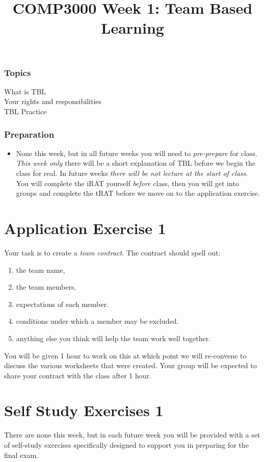 \documentclass[twoside=false,DIV=14]{scrartcl}
\title{\color{redish} \vspace{-1em}COMP3000 Week 1: Team Based Learning}
\begin{document}
{\color{blackish}\maketitle}\vspace{-7em}

\begin{abstract}
\end{abstract}

\section*{Topics}
\begin{description}
\item[What is TBL]  
\item[Your rights and responsibilities]  
\item[TBL Practice]
\end{description}
\section*{Preparation}
\begin{itemize}
\item None this week, but in all future weeks you will need to \emph{pre-prepare} for class.  \emph{This week only} there will be a short explanation of TBL before we begin the class for real.  In future weeks \emph{there will be not lecture at the start of class}.  You will complete the iRAT yourself \emph{before} class, then you will get into groups and complete the tRAT before we move on to the application exercise.
\end{itemize}


\newpage
\part*{Application Exercise 1}
Your task is to create a \emph{team contract}.  The contract should spell out:
\begin{enumerate}
\item the team name, 
\item the team members, 
\item expectations of each member.  
\item conditions under which a member may be excluded.
\item anything else you think will help the team work well together.
\end{enumerate}

You will be given 1 hour to work on this at which point we will re-convene to discuss the various worksheets that were created.  Your group will be expected to share your contract with the class after 1 hour.

\newpage
\part*{Self Study Exercises 1}

There are none this week, but in each future week you will be provided with a set of self-study exercises specifically designed to support you in preparing for the final exam.
\end{document}
